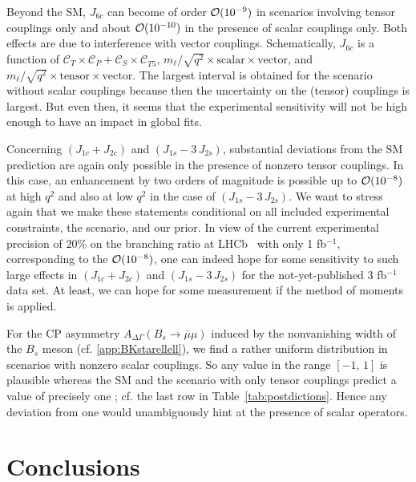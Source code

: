 \documentclass[twocolumn,epjc3]{svjour3}
\numberwithin{equation}{section}
\def \refapp#1{\ref{#1}}
\def \reftab#1{Table~\ref{#1}}
\newcommand{\checked}[1]{{\color{brown}{ {\bf Checked: }{#1}}}}
\renewcommand{\checked}[1]{#1}
\newcommand{\wilson}[2][{}]{\mathcal{C}_{#2}^{\mathrm{#1}}}
\renewcommand{\[}{\big[}
\renewcommand{\]}{\big]}
\renewcommand{\(}{\big(}
\renewcommand{\)}{\big)}
\begin{document}
Beyond the SM, $J_{6c}$ can become of order ${\cal O}(10^{-9})$ in scenarios
involving tensor couplings only and about ${\cal O}(10^{-10})$ in the presence
of scalar couplings only. Both effects are due to interference with vector
couplings.  Schematically, $J_{6c}$ is a function of $\wilson{T} \times
\wilson{P} + \wilson{S} \times \wilson{T5}$, {$m_{\ell}/\sqrt{q^2} \times
\mbox{scalar} \times \mbox{vector}$, and $m_{\ell}/\sqrt{q^2} \times
\mbox{tensor} \times \mbox{vector}$}. The largest interval is obtained for
the scenario without scalar couplings because then the uncertainty on the
(tensor) couplings is largest. But even then, it {seems that the} experimental
sensitivity will not be high enough to have an impact in global fits.

Concerning $(J_{1c} + J_{2c})$ and $(J_{1s} - 3\, J_{2s})$, substantial
deviations from the SM prediction are again only possible in the presence of
nonzero tensor couplings. In this case, an enhancement by two orders of
magnitude is possible up to ${\cal O}(10^{-8})$ at high $q^2$ and also at low
$q^2$ in the case of $(J_{1s} - 3\, J_{2s})$. We want to stress again that we
make these statements conditional on all included experimental constraints, the
scenario, and our prior. In view of the current experimental precision of $20\%$
on the branching ratio at LHCb~\cite{Aaij:2013iag} with only 1 fb$^{-1}$,
corresponding to the ${\cal O}(10^{-8})$, one can indeed hope for some
sensitivity to such large effects in $(J_{1c} + J_{2c})$ and $(J_{1s} - 3\,
J_{2s})$ for the not-yet-published 3 fb$^{-1}$ data set. At least, we can hope
for some measurement if the method of moments~\cite{beaujean:2015mom} is
applied.

For the CP asymmetry $A_{\Delta\Gamma}(B_s\to \bar\mu\mu)$ induced by
the nonvanishing width of the $B_s$ meson
(cf. \refapp{app:BKstarellell}), we find a rather uniform distribution
in scenarios with nonzero scalar couplings. So any value in the range
$[-1,\, 1]$ is plausible whereas {the SM and the scenario
  with only tensor couplings predict a value of precisely one
  \cite{DeBruyn:2012wk}}; cf. the last row in
\reftab{tab:postdictions}. Hence any deviation from one would
unambiguously hint at the presence of scalar operators.


%
%
%
\section{\checked{Conclusions}}
\end{document}
